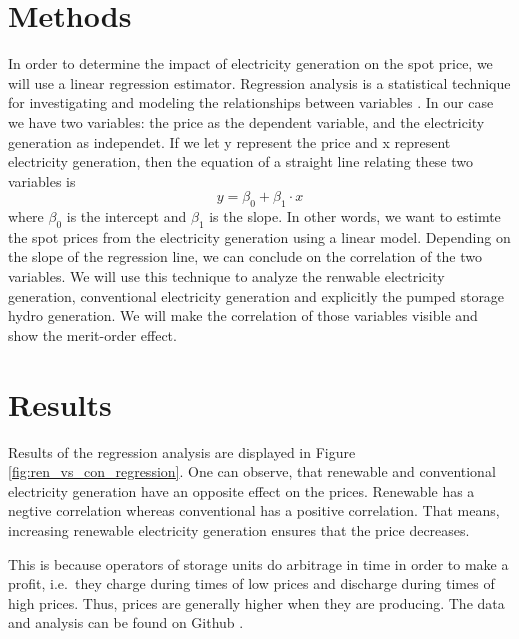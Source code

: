 \documentclass{article}
\begin{document}
\section{Methods}

In order to determine the impact of electricity generation on the spot price, we will use a linear regression estimator. 
Regression analysis is a statistical technique for investigating and modeling the relationships between variables \citep{montgomery2021introduction}. 
In our case we have two variables: the price as the dependent variable, and the electricity generation as independet.
If we let y represent the price and x represent electricity generation, then the equation of a straight line relating these two variables is 
\begin{equation}
    y = \beta_0 + \beta_1\cdot x
\end{equation}
where $\beta_0$ is the intercept and $\beta_1$ is the slope.
In other words, we want to estimte the spot prices from the electricity generation using a linear model.
Depending on the slope of the regression line, we can conclude on the correlation of the two variables. 
We will use this technique to analyze the renwable electricity generation, conventional electricity generation and explicitly the pumped storage hydro generation.
We will make the correlation of those variables visible and show the merit-order effect. 


\section{Results}

Results of the regression analysis are displayed in Figure \ref{fig:ren_vs_con_regression}. 
One can observe, that renewable and conventional electricity generation have an opposite effect on the prices. 
Renewable has a negtive correlation whereas conventional has a positive correlation. 
That means, increasing renewable electricity generation ensures that the price decreases.

This is because operators of storage units do arbitrage in time in order to make a profit, i.e.\ they charge during times of low prices and discharge during times of high prices.
Thus, prices are generally higher when they are producing.
The data and analysis can be found on Github \citep{github_repo}.
\end{document}
